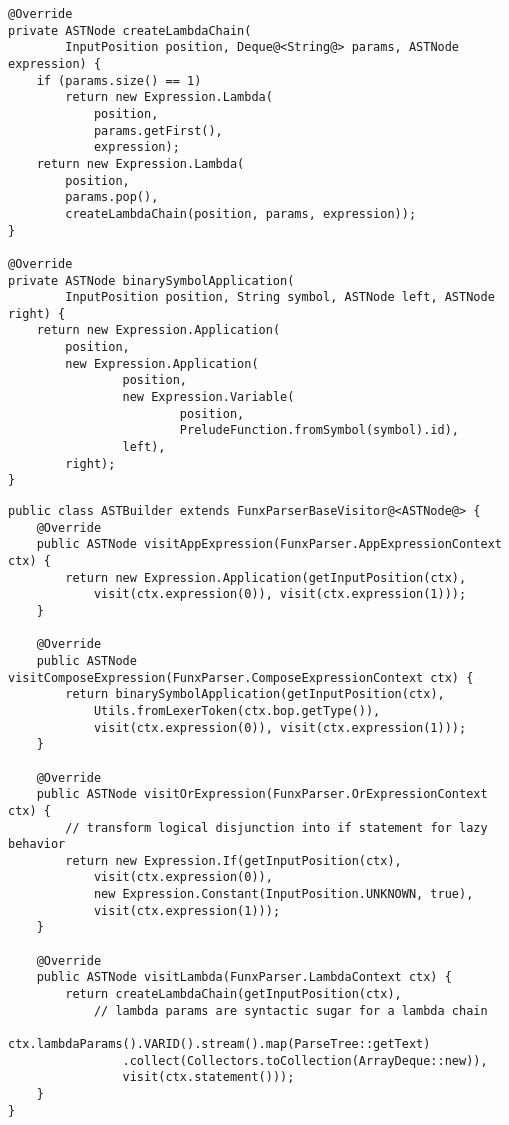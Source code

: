 \begin{lstlisting}[caption={Metodi per astrazioni annidate e operatori simbolici binari}, style=javaCode, label={lst:5-auxiliary-methods-java}]
@Override
private ASTNode createLambdaChain(
        InputPosition position, Deque@<String@> params, ASTNode expression) {
    if (params.size() == 1)
        return new Expression.Lambda(
            position,
            params.getFirst(),
            expression);
    return new Expression.Lambda(
        position,
        params.pop(),
        createLambdaChain(position, params, expression));
}

@Override
private ASTNode binarySymbolApplication(
        InputPosition position, String symbol, ASTNode left, ASTNode right) {
    return new Expression.Application(
        position,
        new Expression.Application(
                position,
                new Expression.Variable(
                        position,
                        PreludeFunction.fromSymbol(symbol).id),
                left),
        right);
}
\end{lstlisting}
\vspace{4mm}
\begin{lstlisting}[caption={Alcuni metodi \textit{visit} di \texttt{ASTBuilder}}, style=javaCode, label={lst:5-astbuilder-java}]
public class ASTBuilder extends FunxParserBaseVisitor@<ASTNode@> {
    @Override
    public ASTNode visitAppExpression(FunxParser.AppExpressionContext ctx) {
        return new Expression.Application(getInputPosition(ctx),
            visit(ctx.expression(0)), visit(ctx.expression(1)));
    }

    @Override
    public ASTNode visitComposeExpression(FunxParser.ComposeExpressionContext ctx) {
        return binarySymbolApplication(getInputPosition(ctx),
            Utils.fromLexerToken(ctx.bop.getType()),
            visit(ctx.expression(0)), visit(ctx.expression(1)));
    }
    
    @Override
    public ASTNode visitOrExpression(FunxParser.OrExpressionContext ctx) {
        // transform logical disjunction into if statement for lazy behavior
        return new Expression.If(getInputPosition(ctx),
            visit(ctx.expression(0)),
            new Expression.Constant(InputPosition.UNKNOWN, true),
            visit(ctx.expression(1)));
    }

    @Override
    public ASTNode visitLambda(FunxParser.LambdaContext ctx) {
        return createLambdaChain(getInputPosition(ctx),
            // lambda params are syntactic sugar for a lambda chain
            ctx.lambdaParams().VARID().stream().map(ParseTree::getText)
                .collect(Collectors.toCollection(ArrayDeque::new)),
                visit(ctx.statement()));
    }
}    
\end{lstlisting}

